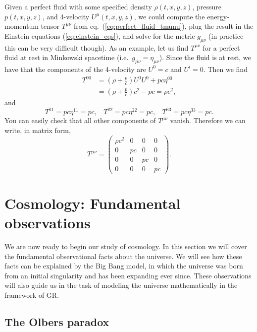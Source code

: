 \documentclass[11pt, a4paper,oneside,openright]{book}
\numberwithin{equation}{section}
\begin{document}
Given a perfect fluid with some specified density $\rho(t,x,y,z)$, pressure $p(t,x,y,z)$, and 4-velocity $U^{\mu}(t,x,y,z)$, we could compute the energy-momentum tensor $T^{\mu\nu}$ from eq.\ (\ref{eq:perfect_fluid_tmunu}), plug the result in the Einstein equations (\ref{eq:einstein_eqs}), and solve for the metric $g_{\mu\nu}$ (in practice this can be very difficult though). As an example, let us find $T^{\mu\nu}$ for a perfect fluid at rest in Minkowski spacetime (i.e.\ $g_{\mu\nu}=\eta_{\mu\nu}$). Since the fluid is at rest, we have that the components of the 4-velocity are $U^0=c$ and $U^i=0$. Then we find
\begin{equation}
\begin{split}
T^{00}&=\left(\rho+\frac{p}{c}\right)U^{0}U^{0}+pc\eta^{00}\\
&=\left(\rho+\frac{p}{c}\right)c^2-pc=\rho c^2,
\end{split}
\end{equation}
and
\begin{equation}
T^{11}=pc\eta^{11}=pc,~~~~T^{22}=pc\eta^{22}=pc,~~~~T^{33}=pc\eta^{33}=pc.
\end{equation}
You can easily check that all other components of $T^{\mu\nu}$ vanish. Therefore we can write, in matrix form,
\begin{equation}
T^{\mu\nu}=\left( \begin{array}{cccc} \rho c^2 & 0 & 0 & 0 \\ 
0 & pc & 0 & 0 \\
0 & 0 & pc & 0 \\
0 & 0 & 0 & pc\end{array} \right).
\end{equation}


\section{Cosmology: Fundamental observations}

We are now ready to begin our study of cosmology. In this section we will cover the fundamental observational facts about the universe. We will see how these facts can be explained by the Big Bang model, in which the universe was born from an initial singularity and has been expanding ever since. These observations will also guide us in the task of modeling the universe mathematically in the framework of GR.

\subsection{The Olbers paradox}
\end{document}
